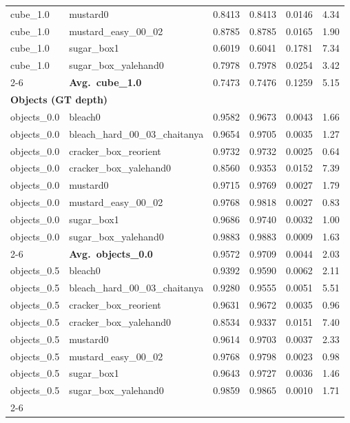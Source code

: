\begin{longtable}{llrrrr}
  cube_1.0 & mustard0 & 0.8413 & 0.8413 & 0.0146 & 4.34 \\
  cube_1.0 & mustard\_easy\_00\_02 & 0.8785 & 0.8785 & 0.0165 & 1.90 \\
  cube_1.0 & sugar\_box1 & 0.6019 & 0.6041 & 0.1781 & 7.34 \\
  cube_1.0 & sugar\_box\_yalehand0 & 0.7978 & 0.7978 & 0.0254 & 3.42 \\
  \cmidrule{2-6}
  & \textbf{Avg.~cube_1.0} & 0.7473 & 0.7476 & 0.1259 & 5.15 \\
  \midrule
\multicolumn{6}{l}{\textbf{Objects (GT depth)}} \\
\midrule
  objects_0.0 & bleach0 & 0.9582 & 0.9673 & 0.0043 & 1.66 \\
  objects_0.0 & bleach\_hard\_00\_03\_chaitanya & 0.9654 & 0.9705 & 0.0035 & 1.27 \\
  objects_0.0 & cracker\_box\_reorient & 0.9732 & 0.9732 & 0.0025 & 0.64 \\
  objects_0.0 & cracker\_box\_yalehand0 & 0.8560 & 0.9353 & 0.0152 & 7.39 \\
  objects_0.0 & mustard0 & 0.9715 & 0.9769 & 0.0027 & 1.79 \\
  objects_0.0 & mustard\_easy\_00\_02 & 0.9768 & 0.9818 & 0.0027 & 0.83 \\
  objects_0.0 & sugar\_box1 & 0.9686 & 0.9740 & 0.0032 & 1.00 \\
  objects_0.0 & sugar\_box\_yalehand0 & 0.9883 & 0.9883 & 0.0009 & 1.63 \\
  \cmidrule{2-6}
  & \textbf{Avg.~objects_0.0} & 0.9572 & 0.9709 & 0.0044 & 2.03 \\
  \midrule
  objects_0.5 & bleach0 & 0.9392 & 0.9590 & 0.0062 & 2.11 \\
  objects_0.5 & bleach\_hard\_00\_03\_chaitanya & 0.9280 & 0.9555 & 0.0051 & 5.51 \\
  objects_0.5 & cracker\_box\_reorient & 0.9631 & 0.9672 & 0.0035 & 0.96 \\
  objects_0.5 & cracker\_box\_yalehand0 & 0.8534 & 0.9337 & 0.0151 & 7.40 \\
  objects_0.5 & mustard0 & 0.9614 & 0.9703 & 0.0037 & 2.33 \\
  objects_0.5 & mustard\_easy\_00\_02 & 0.9768 & 0.9798 & 0.0023 & 0.98 \\
  objects_0.5 & sugar\_box1 & 0.9643 & 0.9727 & 0.0036 & 1.46 \\
  objects_0.5 & sugar\_box\_yalehand0 & 0.9859 & 0.9865 & 0.0010 & 1.71 \\
  \cmidrule{2-6}

\end{longtable}
